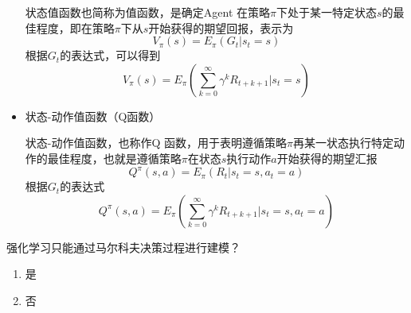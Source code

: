 \begin{note}
\begin{itemize}
        状态值函数也简称为值函数，是确定Agent 在策略$\pi$下处于某一特定状态$s$的最佳程度，即在策略$\pi$下从$s$开始获得的期望回报，表示为
        \[
            V_{\pi}(s) = E_{\pi}\left( G_t|s_t = s \right)
        \]
        根据$G_t$的表达式，可以得到
        \[
            V_{\pi}(s) = E_{\pi}\left( \sum_{k= 0}^{\infty}\gamma^kR_{t+k+1}|s_t = s \right)
        \]
        \item 状态-动作值函数（Q函数）
        
        状态-动作值函数，也称作Q 函数，用于表明遵循策略$\pi$再某一状态执行特定动作的最佳程度，也就是遵循策略$\pi$在状态$s$执行动作$a$开始获得的期望汇报
        \[
            Q^{\pi}(s,a) = E_{\pi}\left( R_{t}|s_t = s,a_t = a \right)
        \]
        根据$G_t$的表达式
        \[
            Q^{\pi}(s,a) = E_{\pi}\left(  \sum_{k= 0}^{\infty}\gamma^kR_{t+k+1}|s_t = s,a_t = a \right)
        \]
    \end{itemize}
\end{note}
\begin{example}
    强化学习只能通过马尔科夫决策过程进行建模？
    \begin{enumerate}[A]
        \item 是
        \item \textcolor{main1}{否}
    \end{enumerate}
\end{example}
